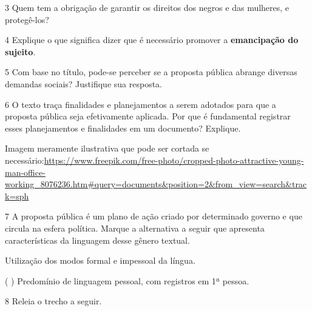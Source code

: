 \begin{itemize}


\num{3} Quem tem a obrigação de garantir os direitos dos negros e das
mulheres, e protegê-los?



\num{4} Explique o que significa dizer que é necessário promover a
\textbf{emancipação do sujeito}.



\num{5} Com base no título, pode-se perceber se a proposta pública abrange
diversas demandas sociais? Justifique sua resposta.



\num{6} O texto traça finalidades e planejamentos a serem adotados para que a
proposta pública seja efetivamente aplicada. Por que é fundamental
registrar esses planejamentos e finalidades em um documento? Explique.

Imagem meramente ilustrativa que pode ser cortada se
necessário:\url{https://www.freepik.com/free-photo/cropped-photo-attractive-young-man-office-working_8076236.htm\#query=documents\&position=2\&from_view=search\&track=sph}



\num{7} A proposta pública é um plano de ação criado por determinado governo
e que circula na esfera política. Marque a alternativa a seguir que
apresenta características da linguagem desse gênero textual.

 Utilização dos modos formal e impessoal da língua.

( ) Predomínio de linguagem pessoal, com registros em 1ª pessoa.

\num{8} Releia o trecho a seguir.


\end{itemize}
